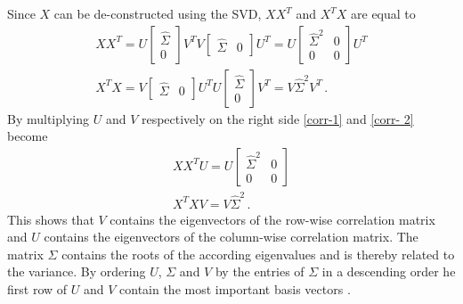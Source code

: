 Since \(X\) can be de-constructed using the SVD, \(XX^{T}\) and \(X^{T}X\) are equal to
\begin{gather}
XX^{T} = U\begin{bmatrix}
\hat{\Sigma} \\
0
\end{bmatrix}V^{T}V\begin{bmatrix}
\hat{\Sigma} & 0
\end{bmatrix}U^{T} = U \begin{bmatrix}
\hat{\Sigma}^{2} & 0 \\
0 & 0
\end{bmatrix} U^{T} \label{corr-1}\\
X^{T}X = V \begin{bmatrix}
\hat{\Sigma} & 0
\end{bmatrix} U^{T}U \begin{bmatrix}
\hat{\Sigma} \\
0
\end{bmatrix} V^{T} = V\hat{\Sigma}^{2}V^{T} \,. \label{corr- 2}
\end{gather}
By multiplying \(U\) and \(V\) respectively on the right side \ref{corr-1} and \ref{corr- 2} become
\begin{gather}
XX^{T}U = U \begin{bmatrix}
\hat{\Sigma}^{2} & 0 \\
0 & 0
\end{bmatrix} \\
X^{T}XV = V\hat{\Sigma}^{2} \,.
\end{gather}
This shows that \(V\) contains the eigenvectors of the row-wise correlation matrix and \(U\) contains the eigenvectors of the column-wise correlation matrix.
The matrix \(\Sigma\) contains the roots of the according eigenvalues and is thereby related to the variance.
By ordering \(U\), \(\Sigma\) and \(V\) by the entries of \(\Sigma\) in a descending order he first row of \(U\) and \(V\) contain the most important basis vectors \cite{brunton_kutz_2019b}.

